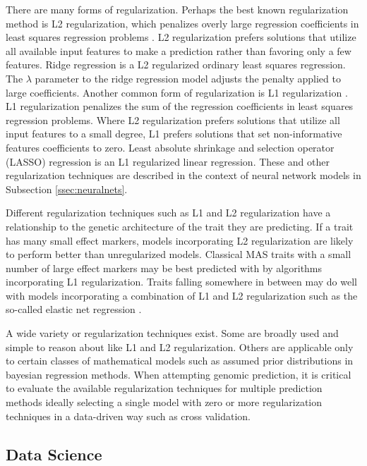 There are many forms of regularization. Perhaps the best known regularization
method is L2 regularization, which penalizes overly large regression coefficients in least 
squares regression problems \citep{tibshirani1996}. L2 regularization prefers solutions that utilize all available 
input features to make a prediction rather than favoring only a few features. Ridge regression
is a L2 regularized ordinary least squares regression. The $\lambda$ parameter to
the ridge regression model adjusts the penalty applied to large coefficients. Another common
form of regularization is L1 regularization \citep{tibshirani1996}. L1 regularization penalizes the sum of the regression
coefficients in least squares regression problems. Where L2 regularization prefers solutions that
utilize all input features to a small degree, L1 prefers solutions that set non-informative features coefficients
to zero. Least absolute shrinkage and selection operator (LASSO) regression is an L1 regularized
linear regression. These and other regularization techniques are described in the context
of neural network models in Subsection \ref{ssec:neuralnets}.

Different regularization techniques such as L1 and L2 regularization have a relationship
to the genetic architecture of the trait they are predicting. If a trait has many small 
effect markers, models incorporating L2 regularization are likely to perform better
than unregularized models. Classical MAS traits with a small number of large effect
markers may be best predicted with by algorithms incorporating L1 regularization. 
Traits falling somewhere in between may do well with models incorporating a combination
of L1 and L2 regularization such as the so-called elastic net regression \citep{zou2005}.

A wide variety or regularization techniques exist. Some are broadly used and simple
to reason about like L1 and L2 regularization. Others are applicable only to certain 
classes of mathematical models such as assumed prior distributions in bayesian
regression methods. When attempting genomic prediction, it is critical to evaluate 
the available regularization techniques for multiple prediction methods ideally selecting 
a single model with zero or more regularization techniques in a data-driven way such 
as cross validation. 

\subsection*{Data Science}

